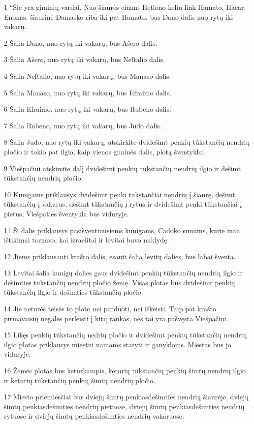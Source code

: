 \par 1 “Šie yra giminių vardai. Nuo šiaurės einant Hetlono keliu link Hamato, Hacar Enonas, šiaurinė Damasko riba iki pat Hamato, bus Dano dalis nuo rytų iki vakarų. 
\par 2 Šalia Dano, nuo rytų iki vakarų, bus Ašero dalis. 
\par 3 Šalia Ašero, nuo rytų iki vakarų, bus Neftalio dalis. 
\par 4 Šalia Neftalio, nuo rytų iki vakarų, bus Manaso dalis. 
\par 5 Šalia Manaso, nuo rytų iki vakarų, bus Efraimo dalis. 
\par 6 Šalia Efraimo, nuo rytų iki vakarų, bus Rubeno dalis. 
\par 7 Šalia Rubeno, nuo rytų iki vakarų, bus Judo dalis. 
\par 8 Šalia Judo, nuo rytų iki vakarų, atskirkite dvidešimt penkių tūkstančių nendrių pločio ir tokio pat ilgio, kaip vienos giminės dalis, plotą šventyklai. 
\par 9 Viešpačiui atskirsite dalį dvidešimt penkių tūkstančių nendrių ilgio ir dešimt tūkstančių nendrių pločio. 
\par 10 Kunigams priklausys dvidešimt penki tūkstančiai nendrių į šiaurę, dešimt tūkstančių į vakarus, dešimt tūkstančių į rytus ir dvidešimt penki tūkstančiai į pietus; Viešpaties šventykla bus viduryje. 
\par 11 Ši dalis priklausys pasišventinusiems kunigams, Cadoko sūnums, kurie man ištikimai tarnavo, kai izraelitai ir levitai buvo nuklydę. 
\par 12 Jiems priklausanti krašto dalis, esanti šalia levitų dalies, bus labai šventa. 
\par 13 Levitai šalia kunigų dalies gaus dvidešimt penkių tūkstančių nendrių ilgio ir dešimties tūkstančių nendrių pločio žemę. Visas plotas bus dvidešimt penkių tūkstančių ilgio ir dešimties tūkstančių pločio. 
\par 14 Jie neturės teisės to ploto nei parduoti, nei iškeisti. Taip pat krašto pirmavaisių negalės perleisti į kitų rankas, nes tai yra pašvęsta Viešpačiui. 
\par 15 Likęs penkių tūkstančių nedrių pločio ir dvidešimt penkių tūkstančių nendrių ilgio plotas priklausys miestui namams statyti ir ganykloms. Miestas bus jo viduryje. 
\par 16 Žemės plotas bus keturkampis, keturių tūkstančių penkių šimtų nendrių ilgio ir keturių tūkstančių penkių šimtų nendrių pločio. 
\par 17 Miesto priemiesčiai bus dviejų šimtų penkiasdešimties nendrių šiaurėje, dviejų šimtų penkiasdešimties nendrių pietuose, dviejų šimtų penkiasdešimties nendrių rytuose ir dviejų šimtų penkiasdešimties nendrių vakaruose. 
